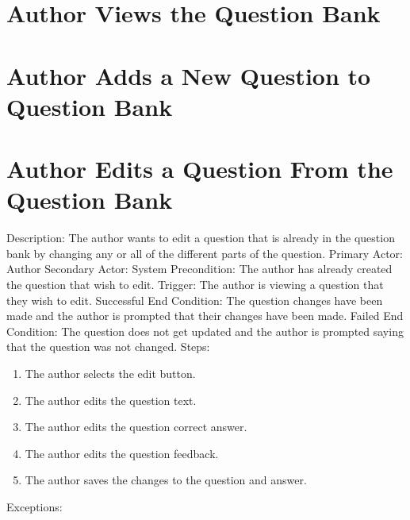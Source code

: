 \begin{enumerate}
    
    \section{Author Views the Question Bank}
    
    
    
    \section{Author Adds a New Question to Question Bank}
    
    
    
    \section{Author Edits a Question From the Question Bank}
        Description: The author wants to edit a question that is already in the question bank by changing any or all of the different parts of the question. \newline
        Primary Actor: Author \newline
        Secondary Actor: System \newline
        Precondition: The author has already created the question that wish to edit. \newline
        Trigger: The author is viewing a question that they wish to edit. \newline
        Successful End Condition: The question changes have been made and the author is prompted that their changes have been made. \newline
        Failed End Condition: The question does not get updated and the author is prompted saying that the question was not changed. \newline
        \newline
        Steps:
        \begin{enumerate}
            \item{The author selects the edit button.}
            \item{The author edits the question text.}
            \item{The author edits the question correct answer.}
            \item{The author edits the question feedback.}
            \item{The author saves the changes to the question and answer.}
        \end{enumerate}
        Exceptions:
        \begin{enumerate}

\end{enumerate}
\end{enumerate}
